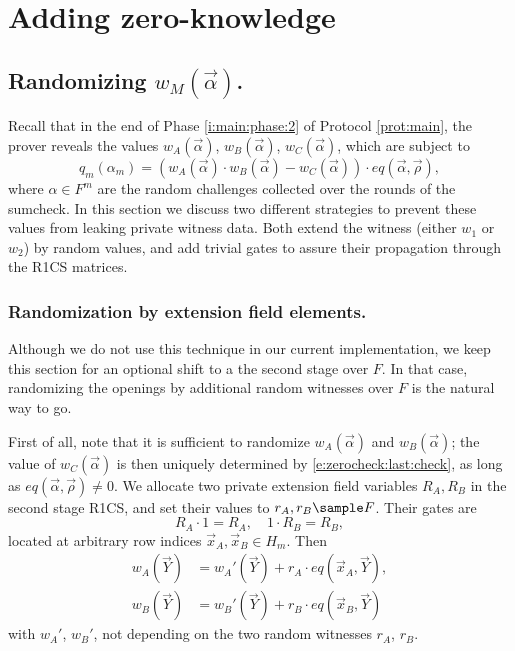 \section{Adding zero-knowledge}
\label{s:zk}


\subsection{Randomizing $w_M(\vec\alpha)$.}
\label{s:randomizing:w_M}

Recall that in the end of Phase \ref{i:main:phase:2} of Protocol \ref{prot:main}, the prover reveals the values
$w_A(\vec\alpha)$, $w_B(\vec\alpha)$, $w_C(\vec\alpha)$, which are subject to 
\begin{equation}
\label{e:zerocheck:last:check}
q_{m}(\alpha_m) = (w_A(\vec\alpha)\cdot w_B(\vec\alpha) - w_C(\vec \alpha))\cdot eq(\vec\alpha,\vec\rho),
\end{equation}
where $\alpha\in F^m$ are the random challenges collected over the rounds of the sumcheck.
In this section we discuss two different strategies to prevent these values from leaking private witness data.
Both extend the witness (either $w_1$ or $w_2$) by random values, and add trivial gates to assure their propagation through the R1CS matrices. 



\subsubsection{Randomization by extension field elements.}

Although we do not use this technique in our current implementation, we keep this section for an optional shift to a the second stage over $F$. 
In that case, randomizing the openings by additional random witnesses over $F$ is the natural way to go.

First of all, note that it is sufficient to randomize $w_A(\vec\alpha)$ and $w_B(\vec\alpha)$; the value of $w_C(\vec\alpha)$ is then uniquely determined by \eqref{e:zerocheck:last:check}, as long as $eq(\vec\alpha, \vec\rho)\neq 0$. 
We allocate two private extension field variables $R_A, R_B$ in the second stage R1CS, and set their values to $r_A, r_B \sample F$. 
Their gates are 
\[
R_A \cdot 1 = R_A, \quad 1 \cdot R_B = R_B, 
\]
located at arbitrary row indices $\vec x_A, \vec x_B \in H_m$.
Then 
\begin{align}
\label{e:wA:randomized:extfield}
w_A(\vec Y) &= w_A'(\vec Y)  + r_A \cdot eq(\vec x_A,\vec Y),
\\
\label{e:wB:randomized:extfield}
w_B(\vec Y) &= w_B'(\vec Y) + r_B \cdot eq(\vec x_B, \vec Y) 
\end{align}
with $w_A'$, $w_B'$, not depending on the two random witnesses $r_A$, $r_B$.
 

